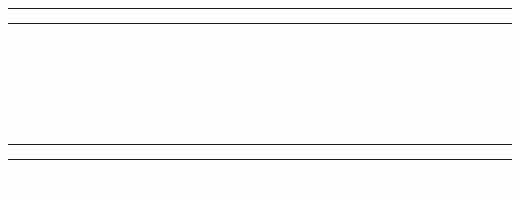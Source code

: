 

\begin{titlepage} %
	
	
	\centering %
	
	\scshape %
	
	\vspace*{\baselineskip} %
	
	
	\textcolor{white}{\rule{\textwidth}{1.6pt}\vspace*{-\baselineskip}\vspace*{2pt} }%
	\textcolor{white}{\rule{\textwidth}{0.4pt} } %
	
	\vspace{0.75\baselineskip} %
	
	\textcolor{white}{\large LECTURE NOTES\\ OF\\ \LARGE \textbf{INTRODUCTION TO MANY BODY THEORY}\\} %
	
	\vspace{0.75\baselineskip} %
	
	\textcolor{white}{\rule{\textwidth}{0.4pt}\vspace*{-\baselineskip}\vspace{3.2pt} }%
	\textcolor{white}{\rule{\textwidth}{1.6pt} }%
	
	\vspace{2\baselineskip} %
	
	
	\textcolor{white}{Collection of the lectures notes of professor Silvestrelli.} %
	
	\vspace*{3\baselineskip} %
	

\end{titlepage}
